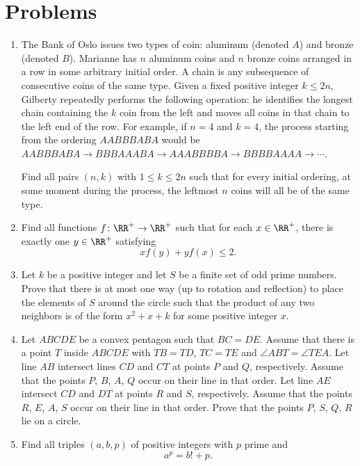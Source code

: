 \documentclass[11pt]{scrartcl}
\begin{document}
\section{Problems}
\begin{enumerate}[\bfseries 1.]
\item %
The Bank of Oslo issues two types of coin: aluminum (denoted $A$) and bronze
(denoted $B$). Marianne has $n$ aluminum coins and $n$ bronze coins arranged in a
row in some arbitrary initial order.
A chain is any subsequence of consecutive coins of the same type.
Given a fixed positive integer $k \leq 2n$,
Gilberty repeatedly performs the following operation:
he identifies the longest chain containing the $k$ coin from the left
and moves all coins in that chain to the left end of the row.
For example, if $n=4$ and $k=4$, the process starting
from the ordering $AABBBABA$ would be
$AABBBABA \to BBBAAABA \to AAABBBBA \to BBBBAAAA \to \dotsb$.

Find all pairs $(n,k)$ with $1 \leq k \leq 2n$
such that for every initial ordering,
at some moment during the process,
the leftmost $n$ coins will all be of the same type.

\item %
Find all functions $f \colon \RR^+ \to \RR^+$ such that for each $x \in \RR^+$,
there is exactly one $y \in \RR^+$ satisfying \[ xf(y)+yf(x) \leq 2. \]

\item %
Let $k$ be a positive integer and let $S$ be a finite set of odd prime numbers.
Prove that there is at most one way (up to rotation and reflection)
to place the elements of $S$ around the circle such that the product
of any two neighbors is of the form $x^2+x+k$ for some positive integer $x$.

\item %
Let $ABCDE$ be a convex pentagon such that $BC=DE$.
Assume that there is a point $T$ inside $ABCDE$
with $TB=TD$, $TC=TE$ and $\angle ABT = \angle TEA$.
Let line $AB$ intersect lines $CD$ and $CT$ at points $P$ and $Q$, respectively.
Assume that the points $P$, $B$, $A$, $Q$ occur on their line in that order.
Let line $AE$ intersect $CD$ and $DT$ at points $R$ and $S$, respectively.
Assume that the points $R$, $E$, $A$, $S$ occur on their line in that order.
Prove that the points $P$, $S$, $Q$, $R$ lie on a circle.

\item %
Find all triples $(a,b,p)$ of positive integers with $p$ prime and
\[ a^p=b!+p. \]


\end{enumerate}
\end{document}
